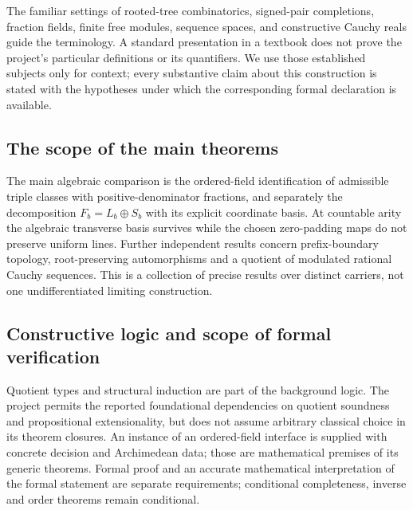 The familiar settings of rooted-tree combinatorics, signed-pair completions, fraction fields, finite free modules, sequence spaces, and constructive Cauchy reals guide the terminology. A standard presentation in a textbook does not prove the project's particular definitions or its quantifiers. We use those established subjects only for context; every substantive claim about this construction is stated with the hypotheses under which the corresponding formal declaration is available.

\subsection{The scope of the main theorems}\label{supp:1-3}
\par{}\par\smallskip

The main algebraic comparison is the ordered-field identification of admissible triple classes with positive-denominator fractions, and separately the decomposition $F_b=L_b\oplus S_b$ with its explicit coordinate basis. At countable arity the algebraic transverse basis survives while the chosen zero-padding maps do not preserve uniform lines. Further independent results concern prefix-boundary topology, root-preserving automorphisms and a quotient of modulated rational Cauchy sequences. This is a collection of precise results over distinct carriers, not one undifferentiated limiting construction.

\subsection{Constructive logic and scope of formal verification}\label{supp:1-4}
\par{}\par\smallskip

Quotient types and structural induction are part of the background logic. The project permits the reported foundational dependencies on quotient soundness and propositional extensionality, but does not assume arbitrary classical choice in its theorem closures. An instance of an ordered-field interface is supplied with concrete decision and Archimedean data; those are mathematical premises of its generic theorems. Formal proof and an accurate mathematical interpretation of the formal statement are separate requirements; conditional completeness, inverse and order theorems remain conditional.

